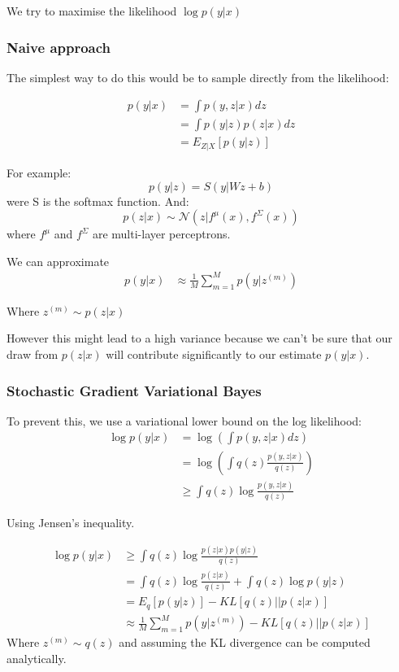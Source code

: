 \documentclass[a4paper]{article}
\begin{document}
We try to maximise the likelihood $\log p(y|x)$

\subsubsection{Naive approach}

The simplest way to do this would be to sample directly from the likelihood:

\begin{align}
 p(y|x) &= \int p(y, z|x) dz \\
 &= \int p(y|z) p(z|x) dz \\
 &= E_{Z | X}[p(y|z)] 
\end{align}

For example:
$$ p(y|z) = S(y | Wz + b) $$ were S is the softmax function.
And:
$$ p(z|x) \sim \mathcal{N}(z | f^\mu(x), f^\Sigma(x))$$ where $f^\mu$ and $f^\Sigma$ are multi-layer perceptrons.

We can approximate
\begin{align}
 p(y|x) &\approx \frac{1}{M} \sum^M_{m=1} p(y | z^{(m)}) 
\end{align}

Where $ z^{(m)} \sim p(z|x) $

However this might lead to a high variance because we can't be sure that our draw from $p(z | x)$ will contribute significantly to our estimate $p(y |x)$.

\subsubsection{Stochastic Gradient Variational Bayes}

To prevent this, we use a variational lower bound on the log likelihood:
\begin{align}
 \log p(y|x) &= \log(\int p(y, z|x) dz) \\
 & =  \log(\int q(z) \frac{p(y, z|x)}{q(z)}) \\
 & \geq \int q(z) \log \frac{p(y, z|x)}{q(z)}
\end{align}

Using Jensen's inequality.

\begin{align}
 \log p(y|x) & \geq \int q(z) \log \frac{p(z|x) p(y| z)}{q(z)} \\
  &= \int q(z) \log \frac{p(z|x)}{q(z)}  + \int q(z) \log p(y|z) \\
  &= E_q[p(y|z)] - KL[q(z) || p(z|x)]\\
  &\approx  \frac{1}{M} \sum^M_{m=1} p(y | z^{(m)}) - KL[q(z) || p(z|x)]
\end{align}
Where $ z^{(m)} \sim q(z)$ and assuming the KL divergence can be computed analytically.
\end{document}
